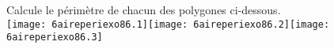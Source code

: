 Calcule le périmètre de chacun des polygones ci-dessous.\\
\texttt{[image: 6aireperiexo86.1]}\hfill\texttt{[image: 6aireperiexo86.2]}\hfill\texttt{[image: 6aireperiexo86.3]}
